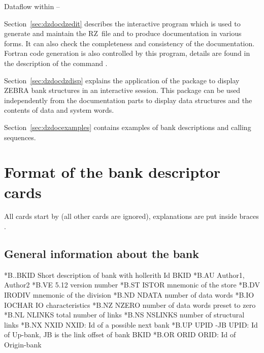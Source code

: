 \begin{Fighere}
  \begin{center}
     \mbox{}
    \caption{Dataflow within \protect{} -- \protect{}}
    \label{fig:DZDOCFIG1}
  \end{center}
\end{Fighere}
 
Section~\ref{sec:dzdocdzedit} 
describes the interactive program  which is used to
generate and maintain the RZ~file and to produce documentation in
various forms. 
It can also check the completeness and consistency of the documentation.
Fortran code generation is also controlled by this program, details
are found in the description of the command .
 
Section~\ref{sec:dzdocdzdisp} 
explains the application of the package to display ZEBRA bank
structures in an interactive session.
This package can be used independently from the documentation parts 
to display data structures and the contents of data and system words.
 
Section~\ref{sec:dzdocexamples} 
contains examples of bank descriptions and calling sequences.
 
\section{Format of the bank descriptor cards}
\label{sec:dzdocformat}
 
\begin{Note}
All cards start by  (all other cards are ignored), explanations
are put inside braces \Lit{\lcb\ \rcb}.
\end{Note}
 
\subsection{General information about the bank}
 
\begin{XMP}
*B..BKID  Short description of bank with hollerith Id BKID
*B.AU     Author1, Author2
*B.VE     5.12         \lcb version number\rcb 
*B.ST     ISTOR        \lcb mnemonic of the store\rcb 
*B.DV     IRODIV       \lcb mnemonic of the division\rcb 
*B.ND     NDATA        \lcb number of data words\rcb 
*B.IO     IOCHAR       \lcb IO characteristics\rcb 
*B.NZ     NZERO        \lcb number of data words preset to zero\rcb 
*B.NL     NLINKS       \lcb total number of links\rcb 
*B.NS     NSLINKS      \lcb number of structural links\rcb 
*B.NX     NXID         \lcb NXID: Id of a possible next bank\rcb 
*B.UP     UPID  -JB    \lcb UPID: Id of Up-bank,
                        JB is the link offset of bank BKID\rcb 
*B.OR     ORID         \lcb ORID: Id of Origin-bank\rcb 
\end{XMP}
 
